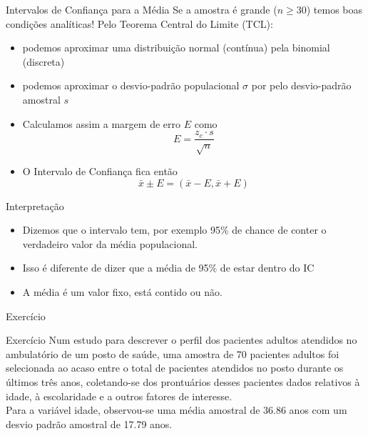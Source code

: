 \documentclass{beamer}
\begin{document}
\begin{frame}{Intervalos de Confiança para a Média}
  Se a amostra é grande ($n \ge 30$) temos boas condições analíticas!
  Pelo Teorema Central do Limite (TCL):
  \begin{itemize}
  \item podemos aproximar uma distribuição normal (contínua) pela
    binomial (discreta)
  \item podemos aproximar o desvio-padrão populacional $\sigma$ por
    pelo desvio-padrão amostral $s$
  \item Calculamos assim a margem de erro $E$ como
    \begin{displaymath}
      E = \frac{z_c \cdot s}{\sqrt{n}}
    \end{displaymath}
  \item O Intervalo de Confiança fica então
    \begin{displaymath}
      \bar{x} \pm E = (\bar{x}-E , \bar{x} +E)      
    \end{displaymath}
  \end{itemize}
\end{frame}

\begin{frame}{Interpretação}
  \begin{itemize}
  \item Dizemos que o intervalo tem, por exemplo 95\% de chance de
    conter o verdadeiro valor da média populacional.
  \item Isso é diferente de dizer que a média de 95\% de estar dentro
    do IC
  \item A média é um valor fixo, está contido ou não.
  \end{itemize}
\end{frame}

\begin{frame}{Exercício}
  \begin{block}{Exercício}
    Num estudo para descrever o perfil dos pacientes adultos atendidos
    no ambulatório de um posto de saúde, uma amostra de 70 pacientes
    adultos foi selecionada ao acaso entre o total de pacientes
    atendidos no posto durante os últimos três anos, coletando-se dos
    prontuários desses pacientes dados relativos à idade, à
    escolaridade e a outros fatores de interesse.\\

    Para a variável idade, observou-se uma média amostral de 36.86
    anos com um desvio padrão amostral de 17.79 anos.
  \end{block}
\end{frame}
\end{document}
